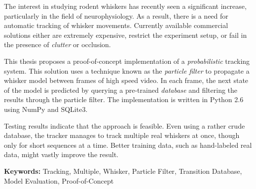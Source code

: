 The interest in studying rodent whiskers has recently seen a significant increase, 
particularly in the field of neurophysiology. As a result, there is a need for automatic 
tracking of whisker movements. Currently available commercial solutions either are 
extremely expensive, restrict the experiment setup, or fail in the presence of 
\emph{clutter} or occlusion. 

This thesis proposes a proof-of-concept implementation of a \emph{probabilistic} tracking system. 
This solution uses a technique known as the \emph{particle filter} to propagate a whisker model between frames of high speed video. 
In each frame, the next state of the model is predicted by querying a pre-trained \emph{database} and filtering the results 
through the particle filter. The implementation is written in Python
2.6 using NumPy and SQLite3.

Testing results indicate that the approach is feasible. Even using a
rather crude database, the tracker manages to track multiple real
whiskers at once, though only for short sequences at a time. Better
training data, such as hand-labeled real data, might vastly improve
the result.

\textbf{Keywords:} Tracking, Multiple, Whisker, Particle Filter, Transition Database, Model Evaluation, Proof-of-Concept
